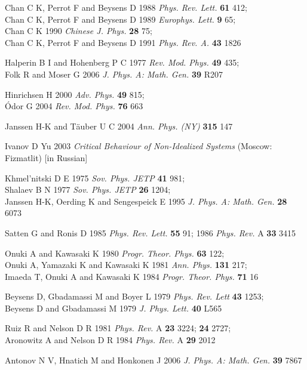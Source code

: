 \begin{thebibliography}{99}
Chan C K, Perrot F and Beysens D 1988
{\it Phys. Rev. Lett.}
{\bf 61} 412;\\
Chan C K, Perrot F and Beysens D 1989
{\it Europhys. Lett.}
{\bf 9} 65;\\
Chan C K 1990 
{\it Chinese J. Phys.}
{\bf 28} 75;\\
Chan C K, Perrot F and Beysens D 1991
{\it Phys. Rev. A.}
{\bf 43} 1826

 Halperin B I and Hohenberg P C 1977 {\it Rev. Mod. Phys.}
{\bf 49} 435;\\ Folk R and Moser G 2006 {\it J. Phys. A: Math. Gen.}
{\bf 39} R207

 Hinrichsen H 2000 {\it Adv. Phys.} {\bf 49} 815;\\
 \'Odor G 2004 {\it Rev. Mod. Phys.} {\bf 76} 663

 Janssen H-K and T\"{a}uber U C 2004 {\it Ann. Phys. (NY)}
{\bf 315} 147

 Ivanov D Yu 2003 {\it Critical Behaviour of
Non-Idealized Systems} (Moscow: Fizmatlit) [in Russian]

 Khmel'nitski D E 1975 {\it Sov. Phys. JETP} {\bf 41} 981;\\
Shalaev B N 1977 {\it Sov. Phys. JETP} {\bf 26} 1204;\\
Janssen H-K, Oerding K and Sengespeick E 1995
{\it J. Phys. A: Math. Gen.} {\bf 28} 6073

 Satten G and Ronis D 1985 {\it Phys. Rev. Lett.}
{\bf 55} 91; 1986 {\it Phys. Rev.} A {\bf 33} 3415

 Onuki A and Kawasaki K 1980 {\it Progr. Theor. Phys.}
{\bf 63} 122;\\
Onuki A, Yamazaki K and Kawasaki K 1981 {\it Ann. Phys.} {\bf 131} 217;\\
Imaeda T, Onuki A and Kawasaki K 1984 {\it Progr. Theor. Phys.} {\bf 71} 16

 Beysens D, Gbadamassi M and Boyer L 1979
{\it Phys. Rev. Lett} {\bf 43} 1253;\\
Beysens D and Gbadamassi M 1979 {\it J. Phys. Lett.} {\bf 40} L565

 Ruiz R and Nelson D R 1981 {\it Phys. Rev.} A {\bf 23}
3224; {\bf 24} 2727;\\
Aronowitz A and Nelson D R 1984 {\it Phys. Rev.} A {\bf 29} 2012



 Antonov N V, Hnatich M and Honkonen J 2006
{\it J. Phys. A: Math. Gen.} {\bf 39} 7867


\end{thebibliography}
